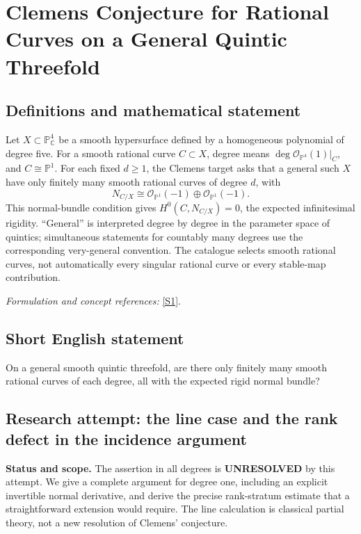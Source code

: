\documentclass[11pt]{article}
\begin{document}
\section*{\texorpdfstring{Clemens Conjecture for Rational Curves on a General Quintic Threefold}{Clemens Conjecture for Rational Curves on a General Quintic Threefold}}\label{statement}
\subsection{Definitions and mathematical statement}
Let $X\subset{\mathbb{P}}^4_{{\mathbb{C}}}$ be a smooth hypersurface defined by a homogeneous polynomial of degree five. For a smooth rational curve $C\subset X$, degree means $\deg\mathcal O_{{\mathbb{P}}^4}(1)|_C$, and $C\cong{\mathbb{P}}^1$. For each fixed $d\ge1$, the Clemens target asks that a general such $X$ have only finitely many smooth rational curves of degree $d$, with
\[
 N_{C/X}\cong\mathcal O_{{\mathbb{P}}^1}(-1)\oplus\mathcal O_{{\mathbb{P}}^1}(-1).
\]
This normal-bundle condition gives $H^0(C,N_{C/X})=0$, the expected infinitesimal rigidity. ``General'' is interpreted degree by degree in the parameter space of quintics; simultaneous statements for countably many degrees use the corresponding very-general convention. The catalogue selects smooth rational curves, not automatically every singular rational curve or every stable-map contribution.
\par\smallskip\textit{Formulation and concept references:} \href{https://encyclopediaofmath.org/wiki/Clemens%27_conjecture}{[S1]}.

\subsection{Short English statement}
On a general smooth quintic threefold, are there only finitely many smooth rational curves of each degree, all with the expected rigid normal bundle?
\subsection{Research attempt: the line case and the rank defect in the incidence argument}
\textbf{Status and scope.} The assertion in all degrees is \textbf{UNRESOLVED} by this attempt. We give a complete argument for degree one, including an explicit invertible normal derivative, and derive the precise rank-stratum estimate that a straightforward extension would require. The line calculation is classical partial theory, not a new resolution of Clemens' conjecture.
\end{document}
